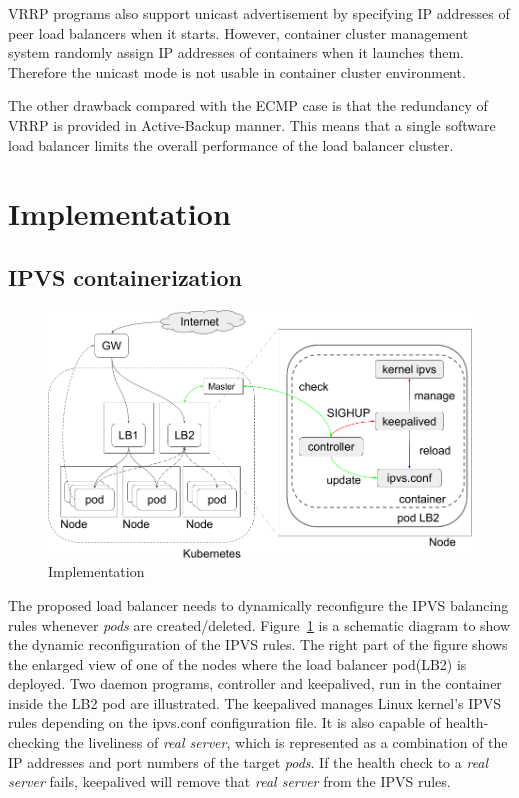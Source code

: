 VRRP programs also support unicast advertisement by specifying IP addresses of peer load balancers when it starts.
However, container cluster management system randomly assign IP addresses of containers when it launches them.
Therefore the unicast mode is not usable in container cluster environment.

The other drawback compared with the ECMP case is that the redundancy of VRRP is provided in Active-Backup manner.
This means that a single software load balancer limits the overall performance of the load balancer cluster.

\section{Implementation}\label{Implementation}

\subsection{IPVS containerization}

\begin{figure}
\includegraphics[width=\columnwidth]{Figs/IPVS-ingress-schem}
\caption{Implementation}
\label{fig:IPVS-ingress-schem}
\end{figure}

The proposed load balancer needs to dynamically reconfigure the IPVS balancing rules whenever {\em pods} are created/deleted. 
Figure~\ref{fig:IPVS-ingress-schem} is a schematic diagram to show the dynamic reconfiguration of the IPVS rules.
The right part of the figure shows the enlarged view of one of the nodes where the load balancer pod(LB2) is deployed.
Two daemon programs, controller and keepalived, run in the container inside the LB2 pod are illustrated.
The keepalived manages Linux kernel's IPVS rules depending on the ipvs.conf configuration file.
It is also capable of health-checking the liveliness of {\em real server}, 
which is represented as a combination of the IP addresses and port numbers of the target {\em pods}. 
If the health check to a {\em real server} fails, keepalived will remove that {\em real server} from the IPVS rules.

